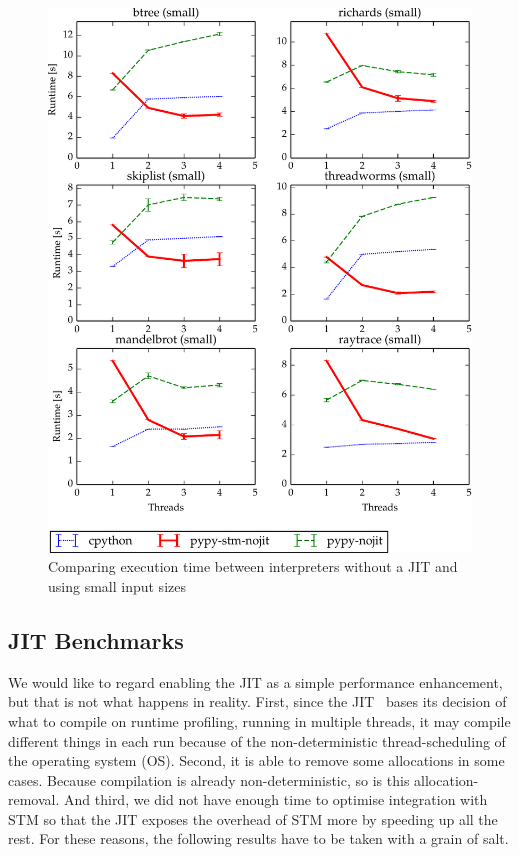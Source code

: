 \documentclass{sigplanconf}
\begin{document}
\begin{figure}[h]
  \centering
  \includegraphics[width=1\columnwidth]{plots/performance_nojit.pdf}
  \caption{Comparing execution time between interpreters without a JIT
    and using small input sizes\label{fig:performance-nojit}}
\end{figure}



\subsection{JIT Benchmarks\label{subsec:jit-benchs}}

We would like to regard enabling the JIT as a simple performance
enhancement, but that is not what happens in reality. First, since the
JIT~\cite{cfbolz09} bases its decision of what to compile on runtime
profiling, running in multiple threads, it may compile different
things in each run because of the non-deterministic thread-scheduling
of the operating system (OS). Second, it is able to remove some
allocations in some cases. Because compilation is already
non-deterministic, so is this allocation-removal. And third, we did
not have enough time to optimise integration with STM so that the JIT
exposes the overhead of STM more by speeding up all the rest.
For these reasons, the following results have to be taken with a grain
of salt.
\end{document}
